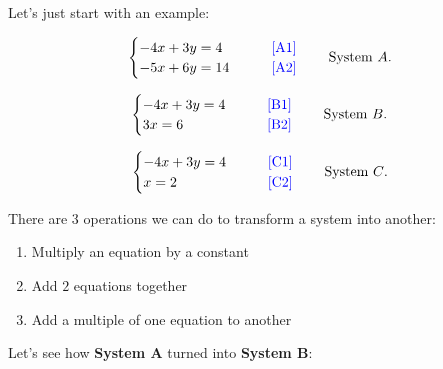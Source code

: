 \label{les_3_unit_2:identify_how_make_equal_system_of_equation}

Let's just start with an example:

\begin{example}
  \label{exm:identify_how_to_make_equal_system_of_equation}

  \begin{equation}
    \label{cse:system_of_equation_a}
    \begin{cases}
      -4x + 3y = 4 \qquad &\textrm{\color{blue}[A1]} \\
      -5x + 6y = 14 \qquad &\textrm{\color{blue}[A2]}
    \end{cases}\qquad \textrm{System $A$}
  .\end{equation}

  \begin{equation}
    \label{cse:system_of_equation_b}
    \begin{cases}
      -4x + 3y = 4 \qquad &\textrm{\color{blue}[B1]} \\
      3x = 6 \qquad &\textrm{\color{blue}[B2]}
    \end{cases}\qquad \textrm{System $B$}
  .\end{equation}

  \begin{equation}
    \label{cse:system_of_equation_c}
    \begin{cases}
      -4x + 3y = 4 \qquad &\textrm{\color{blue}[C1]} \\
      x = 2 \qquad &\textrm{\color{blue}[C2]}
    \end{cases}\qquad \textrm{System $C$}
  .\end{equation}

  There are $3$ operations we can do to transform a system into another:

  \begin{enumerate}
    \label{enum:options_to_transform_a_system_of_equations_into_another_1}

    \item Multiply an equation by a constant
    \item Add $2$ equations together
    \item Add a multiple of one equation to another
  \end{enumerate}

  Let's see how \textbf{System A} turned into \textbf{System B}:


\end{example}
